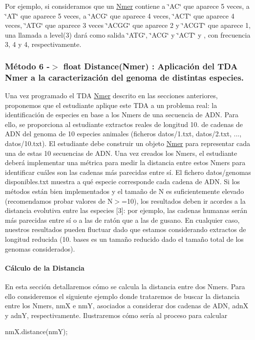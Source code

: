 Por ejemplo, si consideramos que un \hyperlink{classNmer}{Nmer} contiene a \char`\"{}\+A\+C\char`\"{} que aparece 5 veces, a \char`\"{}\+A\+T\char`\"{} que aparece 5 veces, a \char`\"{}\+A\+C\+G\char`\"{} que aparece 4 veces, \char`\"{}\+A\+C\+T\char`\"{} que aparece 4 veces, \char`\"{}\+A\+T\+G\char`\"{} que aparece 3 veces \char`\"{}\+A\+C\+G\+G\char`\"{} que aparece 2 y \char`\"{}\+A\+C\+G\+T\char`\"{} que aparece 1, una llamada a {\ttfamily level(3)} dará como salida \char`\"{}\+A\+T\+G\char`\"{}, \char`\"{}\+A\+C\+G\char`\"{} y \char`\"{}\+A\+C\+T\char`\"{} y , con frecuencia 3, 4 y 4, respectivamente.\hypertarget{index_problemaBiologia}{}\subsubsection{Método 6 -\/$>$ float Distance(\+Nmer) \+: Aplicación del T\+D\+A Nmer a la caracterización del genoma de distintas especies.}\label{index_problemaBiologia}
Una vez programado el T\+DA \hyperlink{classNmer}{Nmer} descrito en las secciones anteriores, proponemos que el estudiante aplique este T\+DA a un problema real\+: la identificación de especies en base a los Nmers de una secuencia de A\+DN. Para ello, se proporciona al estudiante extractos reales de longitud 10. de cadenas de A\+DN del genoma de 10 especies animales (ficheros {\ttfamily datos/1.\+txt}, {\ttfamily datos/2.\+txt}, ..., {\ttfamily datos/10.\+txt}). El estudiante debe construir un objeto \hyperlink{classNmer}{Nmer} para representar cada una de estas 10 secuencias de A\+DN. Una vez creados los Nmers, el estudiante deberá implementar una métrica para medir la distancia entre estos Nmers para identificar cuáles son las cadenas más parecidas entre sí. El fichero {\ttfamily datos/genomas disponibles.\+txt} muestra a qué especie corresponde cada cadena de A\+DN. Si los métodos están bien implementados y el tamaño de N es suficientemente elevado (recomendamos probar valores de N$>$=10), los resultados deben ir acordes a la distancia evolutiva entre las especies \mbox{[}3\mbox{]}\+: por ejemplo, las cadenas humanas serán más parecidas entre sí o a las de ratón que a las de gusano. En cualquier caso, nuestros resultados pueden fluctuar dado que estamos considerando extractos de longitud reducida (10. bases es un tamaño reducido dado el tamaño total de los genomas considerados).\hypertarget{index_dist}{}\paragraph{Cálculo de la Distancia}\label{index_dist}
En esta sección detallaremos cómo se calcula la distancia entre dos Nmers. Para ello consideremos el siguiente ejemplo donde trataremos de buscar la distancia entre los Nmers, nmX e nmY, asociados a considerar dos cadenas de A\+DN, adnX y adnY, respectivamente. Ilustraremos cómo sería al proceso para calcular 
\begin{DoxyCode}
nmX.distance(nmY);
\end{DoxyCode}


